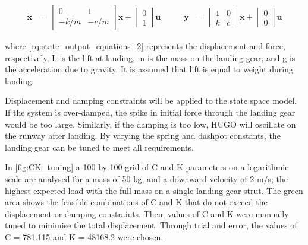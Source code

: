 \begin{equation}
\begin{aligned}
    \dot{\mathbf{x}} &=
    \begin{bmatrix}
        0 & 1 \\
        -k/m & -c/m
    \end{bmatrix}\mathbf{x}
    +
    \begin{bmatrix}
        0 \\
        1
    \end{bmatrix}\mathbf{u}
\end{aligned}
\qquad
\begin{aligned}
    \mathbf{y} &=
    \begin{bmatrix}
        1 & 0 \\
        k & c
    \end{bmatrix}\mathbf{x}
    +
    \begin{bmatrix}
        0 \\
        0
    \end{bmatrix}\mathbf{u}
\end{aligned}
\label{eq:state_output_equations_2}
\end{equation}

where \autoref{eq:state_output_equations_2} represents the displacement and force, respectively, L is the lift at landing, m is the mass on the landing gear, and g is the acceleration due to gravity. It is assumed that lift is equal to weight during landing.

Displacement and damping constraints will be applied to the state space model. If the system is over-damped, the spike in initial force through the landing gear would be too large. Similarly, if the damping is too low, HUGO will oscillate on the runway after landing. By varying the spring and dashpot constants, the landing gear can be tuned to meet all requirements.




In \autoref{fig:CK_tuning} a 100 by 100 grid of C and K parameters on a logarithmic scale are analysed for a mass of 50 kg, and a downward velocity of 2 m/s; the highest expected load with the full mass on a single landing gear strut. The green area shows the feasible combinations of C and K that do not exceed the displacement or damping constraints. Then, values of C and K were manually tuned to minimise the total displacement. Through trial and error, the values of C = 781.115 and K = 48168.2 were chosen.

